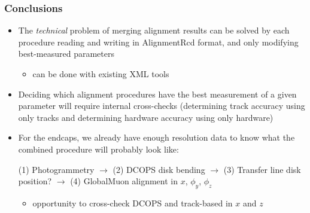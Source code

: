 \documentclass[compress]{beamer}
\begin{document}
\begin{frame}
\frametitle{Conclusions}
\begin{itemize}\setlength{\itemsep}{0.25 cm}
\item The {\it technical} problem of merging alignment results can be
  solved by each procedure reading and writing in AlignmentRcd format,
  and only modifying best-measured parameters
\begin{itemize}
\item can be done with existing XML tools
\end{itemize}

\item Deciding which alignment procedures have the best measurement of
  a given parameter will require internal cross-checks (determining
  track accuracy using only tracks and determining hardware accuracy
  using only hardware)

\item For the endcaps, we already have enough resolution data to know
  what the combined procedure will probably look like:

\vspace{0.1 cm}
(1) Photogrammetry $\to$ (2) DCOPS disk bending $\to$ (3) Transfer line disk position? $\to$ (4) GlobalMuon alignment in $x$, $\phi_y$, $\phi_z$

\begin{itemize}
\item opportunity to cross-check DCOPS and track-based in $x$ and $z$
\end{itemize}

\end{itemize}
\label{numpages}
\end{frame}
\end{document}
